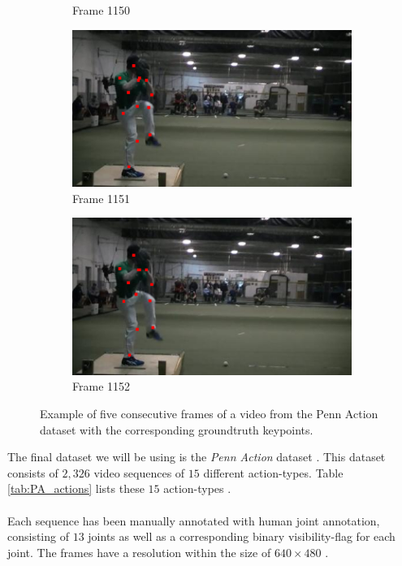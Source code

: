 \documentclass[./main.tex]{subfiles}
\begin{document}
\begin{figure}[htbp]
\begin{subfigure}{0.45\textwidth}
        \caption{Frame 1150}
    \end{subfigure}
    \begin{subfigure}{0.45\textwidth}
        \centering
        \includegraphics[width=\textwidth]{entities/PA_63.png}
        \caption{Frame 1151}
    \end{subfigure}
    \begin{subfigure}{0.45\textwidth}
        \centering
        \includegraphics[width=\textwidth]{entities/PA_64.png}
        \caption{Frame 1152}
    \end{subfigure}
    \caption{Example of five consecutive frames of a video from the Penn Action dataset with the corresponding groundtruth keypoints.}
    \label{fig:PA_dataset}
\end{figure}
The final dataset we will be using is the \textit{Penn Action} dataset \cite{penn_action}. This dataset consists of $2,326$ video sequences of $15$ different action-types. Table \ref{tab:PA_actions} lists these $15$ action-types \cite{penn_action}.
\\
\\
Each sequence has been manually annotated with human joint annotation, consisting of $13$ joints as well as a corresponding binary visibility-flag for each joint. The frames have a resolution within the size of $640 \times 480$ \cite{penn_action}.
\end{document}

